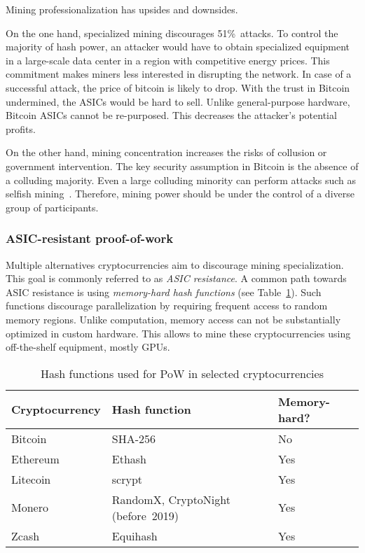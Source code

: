 Mining professionalization has upsides and downsides.

On the one hand, specialized mining discourages 51\%~attacks.
To control the majority of hash power, an attacker would have to obtain specialized equipment in a large-scale data center in a region with competitive energy prices.
This commitment makes miners less interested in disrupting the network.
In case of a successful attack, the price of bitcoin is likely to drop.
With the trust in Bitcoin undermined, the ASICs would be hard to sell.
Unlike general-purpose hardware, Bitcoin ASICs cannot be re-purposed.
This decreases the attacker's potential profits.

On the other hand, mining concentration increases the risks of collusion or government intervention.
The key security assumption in Bitcoin is the absence of a colluding majority.
Even a large colluding minority can perform attacks such as selfish mining~\cite{Eyal2018}.
Therefore, mining power should be under the control of a diverse group of participants.


\subsubsection*{ASIC-resistant proof-of-work}

Multiple alternatives cryptocurrencies aim to discourage mining specialization.
This goal is commonly referred to as \textit{ASIC resistance}.
A common path towards ASIC resistance is using \textit{memory-hard hash functions} (see Table~\ref{tab:pow-coins-hash-functions}).
Such functions discourage parallelization by requiring frequent access to random memory regions.
Unlike computation, memory access can not be substantially optimized in custom hardware.
This allows to mine these cryptocurrencies using off-the-shelf equipment, mostly GPUs.

\begin{table}[]
	\begin{tabular}{|l|l|l|}
		\hline
		\textbf{Cryptocurrency} & \textbf{Hash function} & \textbf{Memory-hard?} \\ \hline
		Bitcoin & SHA-256 & No \\ \hline
		Ethereum & Ethash & Yes \\ \hline
		Litecoin & scrypt & Yes \\ \hline
		Monero & RandomX, CryptoNight (before~2019) & Yes \\ \hline
		Zcash & Equihash & Yes \\ \hline
	\end{tabular}
	\caption{Hash functions used for PoW in selected cryptocurrencies}
	\label{tab:pow-coins-hash-functions}
\end{table}

